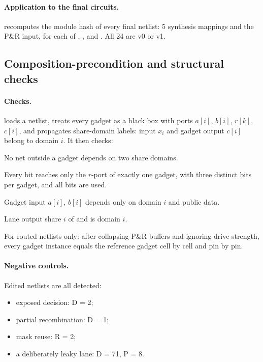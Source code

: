 \paragraph{Application to the final circuits.}  recomputes the module hash of every final netlist: 5 synthesis mappings and the P\&R input, for each of , ,  and . All 24 are v0 or v1.

\subsection{Composition-precondition and structural checks}\label{app:compcheck}
\paragraph{Checks.}  loads a netlist, treats every gadget as a black box with ports $a[i]$, $b[i]$, $r[k]$, $c[i]$, and propagates share-domain labels: input $x_i$ and gadget output $c[i]$ belong to domain $i$. It then checks:
\begin{description}[style=nextline,leftmargin=1.2em]
  \item[D] No net outside a gadget depends on two share domains.
  \item[R] Every  bit reaches only the $r$-port of exactly one gadget, with three distinct bits per gadget, and all bits are used.
  \item[P] Gadget input $a[i]$, $b[i]$ depends only on domain $i$ and public data.
  \item[O] Lane output share $i$ of  and  is domain $i$.
  \item[G] For routed netlists only: after collapsing P\&R buffers and ignoring drive strength, every gadget instance equals the reference gadget cell by cell and pin by pin.
\end{description}

\paragraph{Negative controls.} Edited netlists are all detected:
\begin{itemize}
  \item exposed decision: D = 2;
  \item partial recombination: D = 1;
  \item mask reuse: R = 2;
  \item a deliberately leaky lane: D = 71, P = 8.
\end{itemize}

